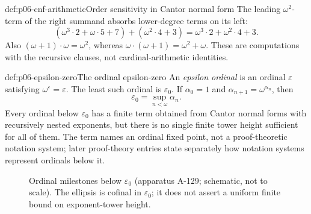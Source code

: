 \begin{hbexample}{def:p06-cnf-arithmetic}{Order sensitivity in Cantor normal form}
The leading \(\omega^2\)-term of the right summand absorbs lower-degree terms
on its left:
\[
 (\omega^3\cdot2+\omega\cdot5+7)
 +(\omega^2\cdot4+3)
 =\omega^3\cdot2+\omega^2\cdot4+3.
\]
Also \((\omega+1)\cdot\omega=\omega^2\), whereas
\(\omega\cdot(\omega+1)=\omega^2+\omega\).  These are computations with the
recursive clauses, not cardinal-arithmetic identities.
\end{hbexample}

\begin{hbdefinition}{def:p06-epsilon-zero}{The ordinal epsilon-zero}
An \emph{epsilon ordinal} is an ordinal \(\varepsilon\) satisfying
\(\omega^\varepsilon=\varepsilon\).  The least such ordinal is
\(\varepsilon_0\).  If \(\alpha_0=1\) and
\(\alpha_{n+1}=\omega^{\alpha_n}\), then
\[
 \varepsilon_0=\sup_{n<\omega}\alpha_n.
\]
Every ordinal below \(\varepsilon_0\) has a finite term obtained from Cantor
normal forms with recursively nested exponents, but there is no single finite
tower height sufficient for all of them.  The term names an ordinal fixed
point, not a proof-theoretic notation system; later proof-theory entries state
separately how notation systems represent ordinals below it.
\end{hbdefinition}

\begin{figure}[htbp]
\centering
{}
\caption{Ordinal milestones below \(\varepsilon_0\) (apparatus A-129;
schematic, not to scale).  The ellipsis is cofinal in \(\varepsilon_0\); it
does not assert a uniform finite bound on exponent-tower height.}
\label{fig:p06-ordinals-epsilon-zero}
\end{figure}

